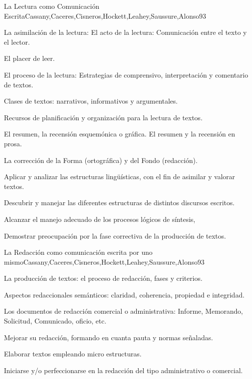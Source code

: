 \begin{syllabus}
\begin{unit}{La Lectura como Comunicación Escrita}{Cassany,Caceres,Cisneros,Hockett,Leahey,Saussure,Alonso}{9}{3}
\begin{topics}
   \item La asimilación de la lectura: El acto de la lectura: Comunicación entre el texto y el lector. 
   \item El placer de leer.  
   \item El proceso de la lectura: Estrategias de comprensivo, interpretación y comentario de textos.
   \item Clases de textos: narrativos, informativos y argumentales. 
   \item Recursos de planificación y organización para la lectura de textos.
   \item El resumen, la recensión esquemónica o gráfica. El resumen y la recensión en prosa.
   \item La corrección de la Forma (ortográfica) y del Fondo (redacción).
\end{topics}
\begin{learningoutcomes}
   \item Aplicar y analizar las estructuras lingüísticas, con el fin de asimilar y valorar textos.
   \item Descubrir y manejar las diferentes estructuras de distintos discursos escritos.
   \item Alcanzar el manejo adecuado de los procesos lógicos de síntesis,
   \item Demostrar preocupación por la fase correctiva de la producción de textos.
\end{learningoutcomes}
\end{unit}

\begin{unit}{La Redacción como comunicación escrita por uno mismo}{Cassany,Caceres,Cisneros,Hockett,Leahey,Saussure,Alonso}{9}{3}
\begin{topics}
   \item La producción de textos: el proceso de redacción, fases y criterios.
   \item Aspectos redaccionales semánticos: claridad, coherencia, propiedad e integridad.
   \item Los documentos de redacción comercial o administrativa: Informe, Memorando, Solicitud, Comunicado, oficio, etc.
\end{topics}
\begin{learningoutcomes}
   \item Mejorar su redacción, formando en cuanta pauta y normas señaladas.
   \item Elaborar textos empleando micro estructuras.
   \item Iniciarse y/o perfeccionarse en la redacción del tipo administrativo o comercial.
\end{learningoutcomes}
\end{unit}


\end{syllabus}
